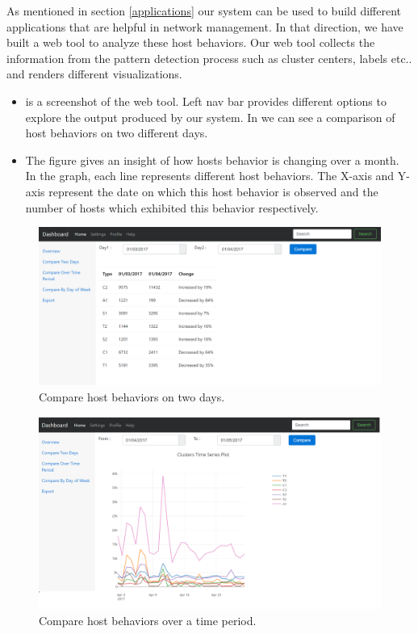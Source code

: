  As mentioned in section \ref{applications} our system can be used to build different applications that are helpful in network management. In that direction, we have built a web tool to analyze these host behaviors. Our web tool collects the information from the pattern detection process such as cluster centers, labels etc.. and renders different visualizations.
 
 \begin{itemize}
 	\item {} is a screenshot of the web tool. Left nav bar provides different options to explore the output produced by our system. In  we can see a comparison of host behaviors on two different days.%
 	
 	\item The figure  gives an insight of how hosts behavior is changing over a month.
 	In the graph, each line represents different host behaviors. The X-axis and Y-axis
 	represent the date on which this host behavior is observed and the number of hosts
 	which exhibited this behavior respectively.
 	
 \end{itemize}
 
 
\begin{figure}[t]
	\centerline{\includegraphics[scale = 0.45]{tool_compare_days.png}}
	\caption{Compare host behaviors on two days.}%
\end{figure} 


\begin{figure}[b]
	\centerline{\includegraphics[scale = 0.45]{tool_compare_week.png}}
	\caption{Compare host behaviors over a time period.}%
\end{figure}
